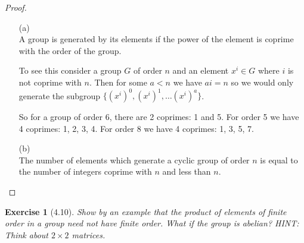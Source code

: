 \documentclass[12pt,leqno]{article}
\numberwithin{equation}{section}
\newtheorem*{exer}{Exercise}
\theoremstyle{definition}
\begin{document}
\begin{proof}[Proof]
\begin{enumerate}
\item[(a)] \hfill   \\
    A group is generated by its elements if the power of the element is coprime
    with the order of the group.


    To see this consider a group $G$ of order $n$ and an element $x^i \in G$
    where $i$ is not coprime with $n$. Then for some $a <n $ we have $ai = n$
    so we would only generate the subgroup $\{(x^i)^0, (x^i)^1, \dots (x^i)^a
    \}$.

    So for a group of order 6, there are 2 coprimes: 1 and 5. For order 5 we
    have 4 coprimes: 1, 2, 3, 4.  For order 8 we have 4 coprimes: 1, 3, 5, 7.


\item[(b)] \hfill   \\

    The number of elements which generate a cyclic group of order $n$ is equal
    to the number of integers coprime with $n$ and less than $n$.

\end{enumerate}

\end{proof}


\begin{exer}[4.10] Show by an example that the product of elements of finite order in a group need not have finite order. What if the group is abelian? HINT: Think about $2 \times 2$ matrices.

\end{exer}
\end{document}
